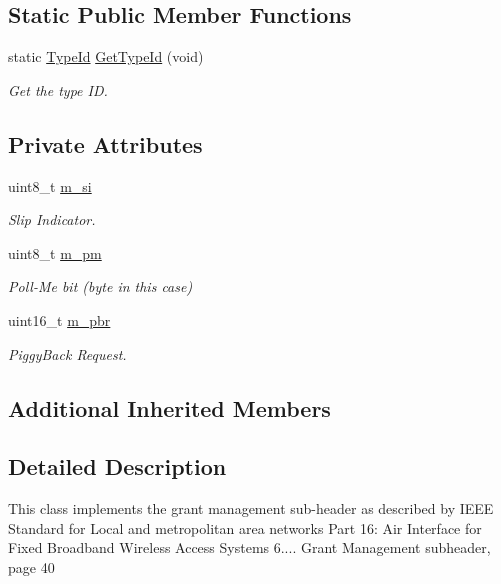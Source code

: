 \subsection*{Static Public Member Functions}
\begin{DoxyCompactItemize}
\item 
static \hyperlink{classns3_1_1TypeId}{Type\+Id} \hyperlink{classns3_1_1GrantManagementSubheader_a815f9dab59846a0ca8a85150c470d7c7}{Get\+Type\+Id} (void)
\begin{DoxyCompactList}\small\item\em Get the type ID. \end{DoxyCompactList}\end{DoxyCompactItemize}
\subsection*{Private Attributes}
\begin{DoxyCompactItemize}
\item 
uint8\+\_\+t \hyperlink{classns3_1_1GrantManagementSubheader_aabae341a66704c1f5663659c7ce110f5}{m\+\_\+si}
\begin{DoxyCompactList}\small\item\em Slip Indicator. \end{DoxyCompactList}\item 
uint8\+\_\+t \hyperlink{classns3_1_1GrantManagementSubheader_aea7a8b4446e3692b0f0add9cbab0cb61}{m\+\_\+pm}
\begin{DoxyCompactList}\small\item\em Poll-\/\+Me bit (byte in this case) \end{DoxyCompactList}\item 
uint16\+\_\+t \hyperlink{classns3_1_1GrantManagementSubheader_a5bbd15f52e626a65900d962618c2f81e}{m\+\_\+pbr}
\begin{DoxyCompactList}\small\item\em Piggy\+Back Request. \end{DoxyCompactList}\end{DoxyCompactItemize}
\subsection*{Additional Inherited Members}


\subsection{Detailed Description}
This class implements the grant management sub-\/header as described by I\+E\+EE Standard for Local and metropolitan area networks Part 16\+: Air Interface for Fixed Broadband Wireless Access Systems 6.... Grant Management subheader, page 40 

